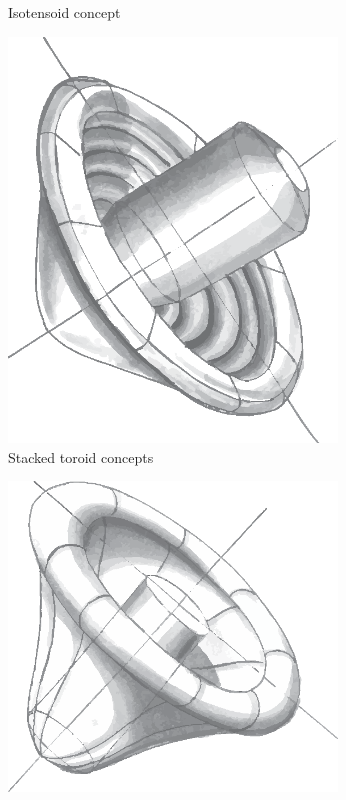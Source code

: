 \begin{figure}[h]
\begin{subfigure}[b]{0.32\textwidth}
		\caption{Isotensoid concept}
		\label{fig:isotensoid}
	\end{subfigure}
	\begin{subfigure}[b]{0.32\textwidth}
		\includegraphics[width=0.96\textwidth]{./Figure/Concepts/stacked_toroid.eps}
		\caption{Stacked toroid concepts}
		\label{fig:stacked_toroid}
	\end{subfigure}
	\begin{subfigure}[b]{0.32\textwidth}
		\includegraphics[width=0.96\textwidth]{./Figure/Concepts/tension_cone.eps}

\end{subfigure}
\end{figure}
